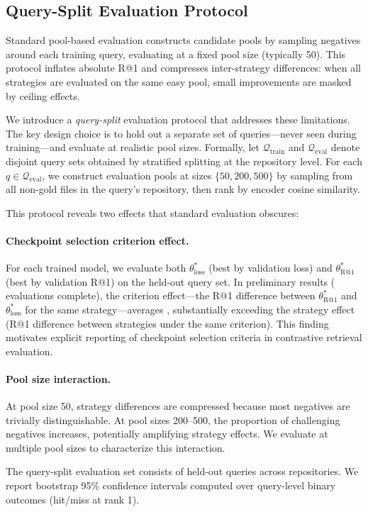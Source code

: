 \subsection{Query-Split Evaluation Protocol}
\label{sec:query-split}

Standard pool-based evaluation constructs candidate pools by sampling negatives around each training query, evaluating at a fixed pool size (typically 50).
This protocol inflates absolute R@1 and compresses inter-strategy differences: when all strategies are evaluated on the same easy pool, small improvements are masked by ceiling effects.

We introduce a \emph{query-split} evaluation protocol that addresses these limitations.
The key design choice is to hold out a separate set of queries---never seen during training---and evaluate at realistic pool sizes.
Formally, let $\mathcal{Q}_{\text{train}}$ and $\mathcal{Q}_{\text{eval}}$ denote disjoint query sets obtained by stratified splitting at the repository level.
For each $q \in \mathcal{Q}_{\text{eval}}$, we construct evaluation pools at sizes $\{50, 200, 500\}$ by sampling from all non-gold files in the query's repository, then rank by encoder cosine similarity.

This protocol reveals two effects that standard evaluation obscures:

\paragraph{Checkpoint selection criterion effect.}
For each trained model, we evaluate both $\theta^*_{\text{loss}}$ (best by validation loss) and $\theta^*_{\text{R@1}}$ (best by validation R@1) on the held-out query set.
In preliminary results ( evaluations complete), the criterion effect---the R@1 difference between $\theta^*_{\text{R@1}}$ and $\theta^*_{\text{loss}}$ for the same strategy---averages , substantially exceeding the strategy effect (R@1 difference between strategies under the same criterion).
This finding motivates explicit reporting of checkpoint selection criteria in contrastive retrieval evaluation.

\paragraph{Pool size interaction.}
At pool size 50, strategy differences are compressed because most negatives are trivially distinguishable.
At pool sizes 200--500, the proportion of challenging negatives increases, potentially amplifying strategy effects.
We evaluate at multiple pool sizes to characterize this interaction.

The query-split evaluation set consists of  held-out queries across  repositories.
We report bootstrap 95\% confidence intervals computed over query-level binary outcomes (hit/miss at rank 1).

